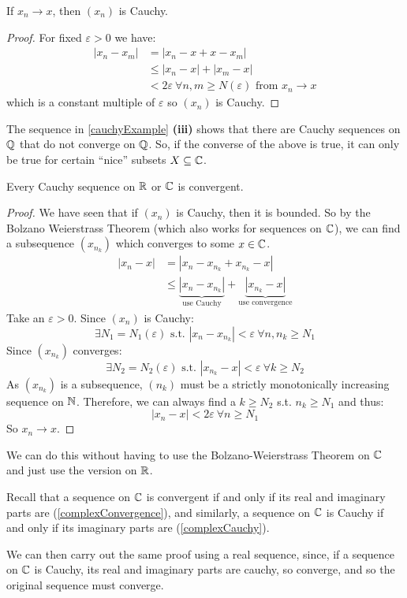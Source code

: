 \documentclass[../main.tex]{subfiles}
\begin{document}
\begin{lemma}
  If $x_n \to x$, then $(x_n)$ is Cauchy.
  \label{convergenceCauchy}
\end{lemma}
\begin{proof}
  For fixed $\varepsilon > 0$ we have:
  \begin{align*}
    |x_n - x_m| &= |x_n - x + x - x_m| \\
                &\leq |x_n  - x| + |x_m - x| \\
                &< 2\varepsilon\ \forall n, m \geq N(\varepsilon) \text{ from $x_n \to x$}
  \end{align*}
  which is a constant multiple of $\varepsilon$ so $(x_n)$ is Cauchy.
\end{proof}
The sequence in \cref{cauchyExample} \textbf{(iii)} shows that there are Cauchy sequences on $\mathbb{Q}$ that do not converge on $\mathbb{Q}$.
So, if the converse of the above is true, it can only be true for certain ``nice'' subsets $X \subseteq \mathbb{C}$.
\begin{theorem}
  Every Cauchy sequence on $\mathbb{R}$ or $\mathbb{C}$ is convergent.
  \label{completenessOfRC}
\end{theorem}
\begin{proof}
  We have seen that if $(x_n)$ is Cauchy, then it is bounded.
  So by the Bolzano Weierstrass Theorem (which also works for sequences on $\mathbb{C}$), we can find a subsequence $(x_{n_k})$ which converges to some $x \in \mathbb{C}$.
  \begin{align*}
    |x_n - x| &= |x_n - x_{n_k} + x_{n_k} - x| \\
              &\leq \underbrace{|x_n - x_{n_k}|}_{\text{use Cauchy}} + \underbrace{|x_{n_k} - x|}_{\text{use convergence}}
  \end{align*}
  Take an $\varepsilon > 0$.
  Since $(x_n)$ is Cauchy:
  \[
    \exists N_1 = N_1(\varepsilon) \text{ s.t. } |x_n - x_{n_k}| < \varepsilon\ \forall n, n_k \geq N_1
  \]
  Since $(x_{n_k})$ converges:
  \[
    \exists N_2 =  N_2(\varepsilon) \text{ s.t. } |x_{n_k} - x| < \varepsilon\ \forall k \geq N_2
  \]
  As $(x_{n_k})$ is a subsequence, $(n_k)$ must be a strictly monotonically increasing sequence on $\mathbb{N}$.
  Therefore, we can always find a $k \geq N_2$ s.t. $n_k \geq N_1$ and thus:
  \[
    |x_n - x| < 2\varepsilon\ \forall n \geq N_1
  \]
  So $x_n \to x$.
\end{proof}
\begin{remark}
  We can do this without having to use the Bolzano-Weierstrass Theorem on $\mathbb{C}$ and just use the version on $\mathbb{R}$.

  Recall that a sequence on $\mathbb{C}$ is convergent if and only if its real and imaginary parts are (\cref{complexConvergence}), and similarly, a sequence on $\mathbb{C}$ is Cauchy if and only if its imaginary parts are (\cref{complexCauchy}).

  We can then carry out the same proof using a real sequence, since, if a sequence on $\mathbb{C}$ is Cauchy, its real and imaginary parts are cauchy, so converge, and so the original sequence must converge.
\end{remark}
\end{document}

